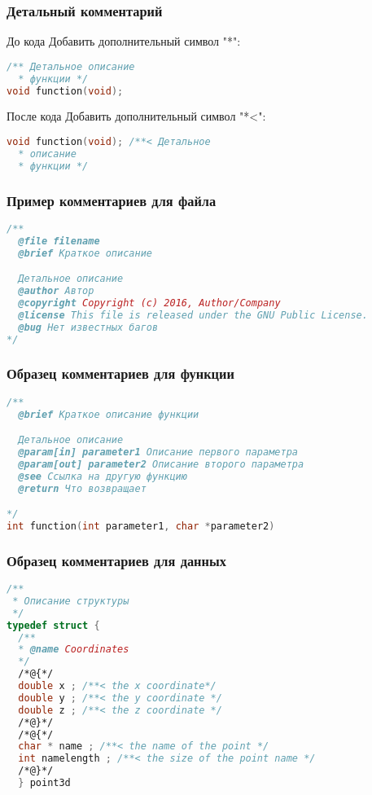 \begin{frame}[fragile]
 \frametitle{Детальный комментарий}
 \begin{block}{До кода}
   Добавить дополнительный символ "*":
   \begin{lstlisting}[language=C]
/** Детальное описание
  * функции */
void function(void);
\end{lstlisting}
 \end{block}
 \begin{block}{После кода}
   Добавить дополнительный символ "*<":
    \begin{lstlisting}[language=C]
void function(void); /**< Детальное 
  * описание
  * функции */
\end{lstlisting}
 \end{block}
\end{frame}

\begin{frame}[fragile]
 \frametitle{Пример комментариев для файла}
\begin{lstlisting}[language=C]
/**
  @file filename
  @brief Краткое описание

  Детальное описание
  @author Автор
  @copyright Copyright (c) 2016, Author/Company
  @license This file is released under the GNU Public License.
  @bug Нет известных багов
*/
\end{lstlisting}
\end{frame}

\begin{frame}[fragile]
 \frametitle{Образец комментариев для функции}
\begin{lstlisting}[language=C]
/**
  @brief Краткое описание функции

  Детальное описание
  @param[in] parameter1 Описание первого параметра
  @param[out] parameter2 Описание второго параметра
  @see Ссылка на другую функцию
  @return Что возвращает

*/
int function(int parameter1, char *parameter2) 
\end{lstlisting}
\end{frame}

\begin{frame}[fragile]
 \frametitle{Образец комментариев для данных}
\begin{lstlisting}[language=C]
/** 
 * Описание структуры 
 */
typedef struct { 
  /** 
  * @name Coordinates
  */
  /*@{*/
  double x ; /**< the x coordinate*/ 
  double y ; /**< the y coordinate */
  double z ; /**< the z coordinate */
  /*@}*/
  /*@{*/
  char * name ; /**< the name of the point */
  int namelength ; /**< the size of the point name */
  /*@}*/
  } point3d
\end{lstlisting}
\end{frame}


